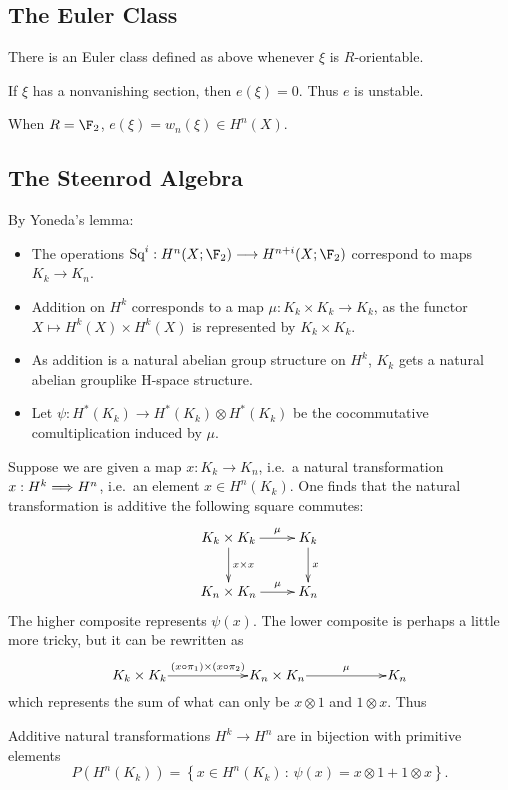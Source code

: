 \documentclass[11pt]{article}
\begin{document}
\subsection{The Euler Class}
\begin{itemise}
\item There is an Euler class defined as above whenever $\xi$ is $R$-orientable.
\item If $\xi$ has a nonvanishing section, then $e(\xi)=0$. Thus $e$ is unstable.
\item When $R=\F_2$, $e(\xi)=w_n(\xi)\in H^n(X)$.
\end{itemise}
\subsection{The Steenrod Algebra}
By Yoneda's lemma:
\begin{itemize}\squishlist
\item The operations $\Squ^i:{H}^{n}(X;\F_2)\to{H}^{n+i}(X;\F_2)$ correspond to maps $K_k\to K_n$.
\item Addition on $H^k$ corresponds to a map $\mu:K_k\times K_k\to K_k$, as the functor $X\mapsto H^k(X)\times H^k(X)$ is represented by $K_k\times K_k$.
\item As addition is a natural abelian group structure on $H^k$, $K_k$ gets a natural abelian grouplike H-space structure. 
\item Let $\psi:H^*(K_k)\to H^*(K_k)\otimes H^*(K_k)$ be the cocommutative comultiplication induced by $\mu$.
\end{itemize}
Suppose we are given a map $x:K_k\to K_n$, i.e.\ a natural transformation $x:H^k\Longrightarrow H^n$, i.e.\ an element $x\in H^n(K_k)$. One finds that the natural transformation is additive \Iff the following square commutes:
\[\xymatrix{
K_k\times K_k
\ar[r]^-{\mu}
\ar[d]^-{x\times x}
&%
K_k
\ar[d]^-{x}
\\%
K_n\times K_n
\ar[r]^-{\mu}
&%
K_n%
}\]
The higher composite represents $\psi(x)$. The lower composite is perhaps a little more tricky, but it can be rewritten as
\[\vcenter{\xymatrix@1@C=2cm{
K_k\times K_k
\ar[r]^-{(x\circ\pi_1)\times (x\circ\pi_2)}
&%
K_n\times K_n
\ar[r]^-{\mu}
&%
K_n%
}}\]
which represents the sum of what can only be $x\otimes 1$ and $1\otimes x$. Thus
\begin{prop*}
Additive natural transformations $H^k\to H^n$ are in bijection with primitive elements
\[P(H^n(K_k))=\left\{x\in H^n(K_k)\,:\,\psi(x)=x\otimes 1+1\otimes x\right\}.\]
\end{prop*}
\end{document}

